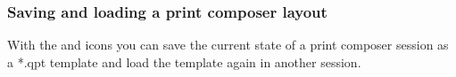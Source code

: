 \subsubsection{Saving and loading a print composer layout}

With the  and
 icons you can save the current
state of a print composer session as a  *.qpt template and load the template
again in another session.

